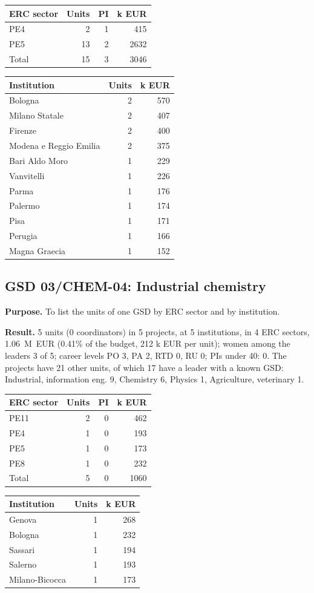 \documentclass[11pt,a4paper]{article}
\begin{document}
{\footnotesize
\begin{longtable}{lrrr}
\toprule
ERC sector & Units & PI & k EUR \\
\midrule
\endhead
PE4 & 2 & 1 & 415 \\
PE5 & 13 & 2 & 2632 \\
\midrule
Total & 15 & 3 & 3046 \\
\bottomrule
\end{longtable}
}
{\footnotesize
\begin{longtable}{lrr}
\toprule
Institution & Units & k EUR \\
\midrule
\endhead
Bologna & 2 & 570 \\
Milano Statale & 2 & 407 \\
Firenze & 2 & 400 \\
Modena e Reggio Emilia & 2 & 375 \\
Bari Aldo Moro & 1 & 229 \\
Vanvitelli & 1 & 226 \\
Parma & 1 & 176 \\
Palermo & 1 & 174 \\
Pisa & 1 & 171 \\
Perugia & 1 & 166 \\
Magna Graecia & 1 & 152 \\
\bottomrule
\end{longtable}
}

\clearpage
\subsection{GSD 03/CHEM-04: Industrial chemistry}
\textbf{Purpose.} To list the units of one GSD by ERC sector and by institution.

\textbf{Result.} 5 units (0 coordinators) in 5 projects, at 5 institutions, in 4 ERC sectors, 1.06~M~EUR (0.41\% of the budget, 212 k EUR per unit); women among the leaders 3 of 5; career levels PO 3, PA 2, RTD 0, RU 0; PIs under 40: 0. The projects have 21 other units, of which 17 have a leader with a known GSD: Industrial, information eng. 9, Chemistry 6, Physics 1, Agriculture, veterinary 1.

{\footnotesize
\begin{longtable}{lrrr}
\toprule
ERC sector & Units & PI & k EUR \\
\midrule
\endhead
PE11 & 2 & 0 & 462 \\
PE4 & 1 & 0 & 193 \\
PE5 & 1 & 0 & 173 \\
PE8 & 1 & 0 & 232 \\
\midrule
Total & 5 & 0 & 1060 \\
\bottomrule
\end{longtable}
}
{\footnotesize
\begin{longtable}{lrr}
\toprule
Institution & Units & k EUR \\
\midrule
\endhead
Genova & 1 & 268 \\
Bologna & 1 & 232 \\
Sassari & 1 & 194 \\
Salerno & 1 & 193 \\
Milano-Bicocca & 1 & 173 \\
\bottomrule
\end{longtable}
}
\end{document}
